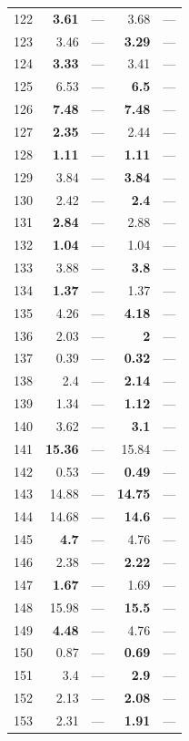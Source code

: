 \begin{longtable}{lr@{\hskip 4pt}l@{\hskip 12pt}r@{\hskip 4pt}l@{\hskip 12pt}}
122 & \textbf{3.61} & --- & 3.68 & --- \\
123 & 3.46 & --- & \textbf{3.29} & --- \\
124 & \textbf{3.33} & --- & 3.41 & --- \\
125 & 6.53 & --- & \textbf{6.5} & --- \\
126 & \textbf{7.48} & --- & \textbf{7.48} & --- \\
127 & \textbf{2.35} & --- & 2.44 & --- \\
128 & \textbf{1.11} & --- & \textbf{1.11} & --- \\
129 & 3.84 & --- & \textbf{3.84} & --- \\
130 & 2.42 & --- & \textbf{2.4} & --- \\
131 & \textbf{2.84} & --- & 2.88 & --- \\
132 & \textbf{1.04} & --- & 1.04 & --- \\
133 & 3.88 & --- & \textbf{3.8} & --- \\
134 & \textbf{1.37} & --- & 1.37 & --- \\
135 & 4.26 & --- & \textbf{4.18} & --- \\
136 & 2.03 & --- & \textbf{2} & --- \\
137 & 0.39 & --- & \textbf{0.32} & --- \\
138 & 2.4 & --- & \textbf{2.14} & --- \\
139 & 1.34 & --- & \textbf{1.12} & --- \\
140 & 3.62 & --- & \textbf{3.1} & --- \\
141 & \textbf{15.36} & --- & 15.84 & --- \\
142 & 0.53 & --- & \textbf{0.49} & --- \\
143 & 14.88 & --- & \textbf{14.75} & --- \\
144 & 14.68 & --- & \textbf{14.6} & --- \\
145 & \textbf{4.7} & --- & 4.76 & --- \\
146 & 2.38 & --- & \textbf{2.22} & --- \\
147 & \textbf{1.67} & --- & 1.69 & --- \\
148 & 15.98 & --- & \textbf{15.5} & --- \\
149 & \textbf{4.48} & --- & 4.76 & --- \\
150 & 0.87 & --- & \textbf{0.69} & --- \\
151 & 3.4 & --- & \textbf{2.9} & --- \\
152 & 2.13 & --- & \textbf{2.08} & --- \\
153 & 2.31 & --- & \textbf{1.91} & --- \\

\end{longtable}
